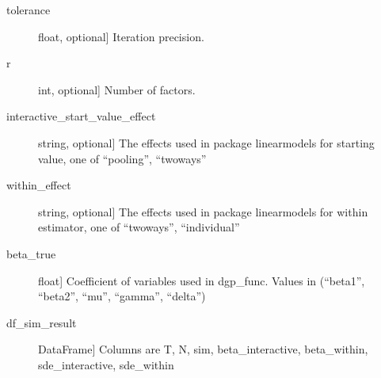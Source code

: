 \documentclass[a4paper,11pt,english]{sphinxmanual}
\begin{document}
\begin{fulllineitems}
\begin{description}
\item[{tolerance}] \leavevmode{[}float, optional{]}
\sphinxAtStartPar
Iteration precision.

\item[{r}] \leavevmode{[}int, optional{]}
\sphinxAtStartPar
Number of factors.

\item[{interactive\_start\_value\_effect}] \leavevmode{[}string, optional{]}
\sphinxAtStartPar
The effects used in package linearmodels for starting value, one of “pooling”,
“twoways”

\item[{within\_effect}] \leavevmode{[}string, optional{]}
\sphinxAtStartPar
The effects used in package linearmodels for within estimator, one of “twoways”,
“individual”

\item[{beta\_true}] \leavevmode{[}float{]}
\sphinxAtStartPar
Coefficient of variables used in dgp\_func. Values in (“beta1”, “beta2”, “mu”,
“gamma”, “delta”)

\end{description}
\begin{description}
\item[{df\_sim\_result}] \leavevmode{[}DataFrame{]}
\sphinxAtStartPar
Columns are T, N, sim, beta\_interactive, beta\_within, sde\_interactive,
sde\_within

\end{description}

\end{fulllineitems}

\end{document}
